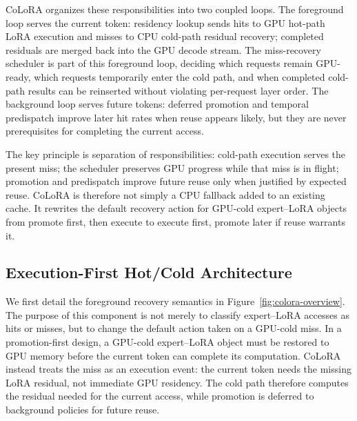 \documentclass[sigplan,anonymous,review,10pt]{acmart}
\begin{document}
CoLoRA organizes these responsibilities into two coupled loops. The foreground loop serves the current token: residency lookup sends hits to GPU hot-path LoRA execution and misses to CPU cold-path residual recovery; completed residuals are merged back into the GPU decode stream. The miss-recovery scheduler is part of this foreground loop, deciding which requests remain GPU-ready, which requests temporarily enter the cold path, and when completed cold-path results can be reinserted without violating per-request layer order. The background loop serves future tokens: deferred promotion and temporal predispatch improve later hit rates when reuse appears likely, but they are never prerequisites for completing the current access.


The key principle is separation of responsibilities: cold-path execution serves the present miss; the scheduler preserves GPU progress while that miss is in flight; promotion and predispatch improve future reuse only when justified by expected reuse. CoLoRA is therefore not simply a CPU fallback added to an existing cache. It rewrites the default recovery action for GPU-cold expert--LoRA objects from promote first, then execute to execute first, promote later if reuse warrants it.


\subsection{Execution-First Hot/Cold Architecture}
\label{subsec:dual-path-handling}

We first detail the foreground recovery semantics in Figure~\ref{fig:colora-overview}. The purpose of this component is not merely to classify expert--LoRA accesses as hits or misses, but to change the default action taken on a GPU-cold miss. In a promotion-first design, a GPU-cold expert--LoRA object must be restored to GPU memory before the current token can complete its computation. CoLoRA instead treats the miss as an execution event: the current token needs the missing LoRA residual, not immediate GPU residency. The cold path therefore computes the residual needed for the current access, while promotion is deferred to background policies for future reuse.
\end{document}
